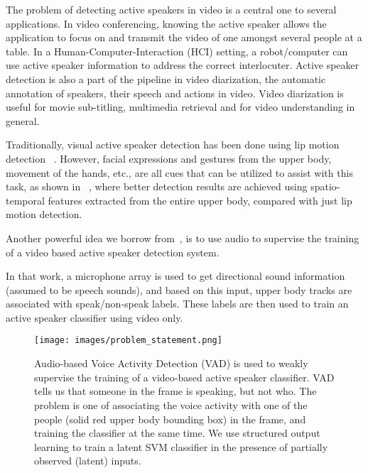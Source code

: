 \documentclass[runningheads]{llncs}
\begin{document}
The problem of detecting active speakers in video is a central one to several applications. In video conferencing, knowing the active speaker allows the application to focus on and transmit the video of one amongst several people at a table. In a Human-Computer-Interaction (HCI) setting, a robot/computer can use active speaker information to address the correct interlocuter. Active speaker detection is also a part of the pipeline in video diarization, the automatic annotation of speakers, their speech and actions in video. Video diarization is useful for movie sub-titling, multimedia retrieval and for video understanding in general.

Traditionally, visual active speaker detection has been done using lip motion detection ~\cite{elKhoury14,Everingham06,Everingham09,Haider12}. However, facial expressions and gestures from the upper body, movement of the hands, etc., are all cues that can be utilized to assist with this task,
as shown in ~\cite{Chakravarty15}, where better detection results are achieved using spatio-temporal features extracted from the entire upper body, compared with just lip motion detection.


Another powerful idea we borrow from~\cite{Chakravarty15}, is to use audio to supervise the training of a video based active speaker detection system.

In that work, a microphone array is used to get directional sound information (assumed to be speech sounds), and based on this input, upper body tracks are associated with speak/non-speak labels. These labels are then used to train an active speaker classifier using video only.

\begin{wrapfigure}[21]{r}{0.5\textwidth}
\centering
\vspace*{-1.1cm} 
    \texttt{[image: images/problem\_statement.png]} 
   \caption{Audio-based Voice Activity Detection (VAD) is used to weakly supervise the training of a video-based active speaker classifier. VAD tells us that someone in the frame is speaking, but not who. The problem is one of associating the voice activity with one of the people (solid red upper body bounding box) in the frame, and training the classifier at the same time. We use structured output learning to train a latent SVM classifier in the presence of partially observed (latent) inputs.}
\label{fig:problemStatement}
\end{wrapfigure}
\end{document}
